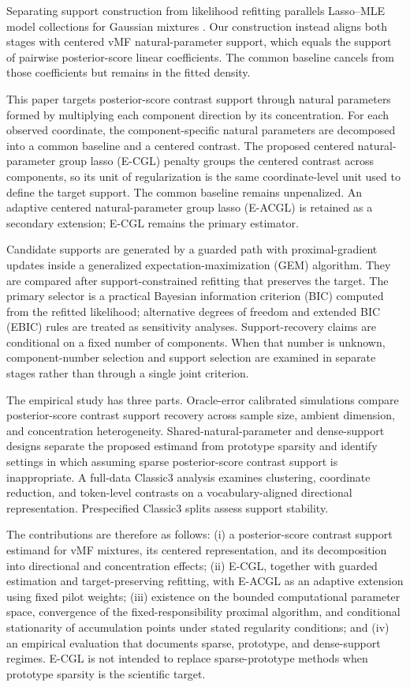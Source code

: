\documentclass[preprint,12pt,authoryear]{elsarticle}
\newcounter{algorithm}
\begin{document}
Separating support construction from likelihood refitting parallels
Lasso--MLE model collections for Gaussian mixtures
\citep{meynet2012thesis,meynet2012sparse}. Our construction instead aligns
both stages with centered vMF natural-parameter support, which equals the
support of pairwise posterior-score linear coefficients. The common baseline
cancels from those coefficients but remains in the fitted density.

This paper targets posterior-score contrast support through natural parameters
formed by multiplying each component direction by its concentration. For each
observed coordinate, the component-specific natural parameters are decomposed
into a common baseline and a centered contrast. The proposed centered
natural-parameter group lasso (E-CGL) penalty
groups the centered contrast across components, so its unit of regularization
is the same coordinate-level unit used to define the target support. The common
baseline remains unpenalized. An adaptive centered natural-parameter group
lasso (E-ACGL) is retained as a secondary extension; E-CGL remains the primary
estimator.

Candidate supports are generated by a guarded path with proximal-gradient
updates inside a generalized expectation-maximization (GEM) algorithm. They
are compared after support-constrained
refitting that preserves the target.
The primary selector is a practical Bayesian information criterion (BIC)
computed from the refitted likelihood; alternative degrees of freedom and
extended BIC (EBIC) rules are treated as sensitivity
analyses. Support-recovery claims are conditional on a fixed number of components.
When that number is unknown, component-number selection and support selection
are examined in separate stages rather than through a single joint criterion.

The empirical study has three parts. Oracle-error calibrated simulations
compare posterior-score contrast support recovery across sample size, ambient
dimension, and concentration heterogeneity. Shared-natural-parameter and
dense-support designs separate the proposed estimand from prototype sparsity
and identify settings in which assuming sparse posterior-score contrast
support is inappropriate. A full-data Classic3
analysis examines clustering, coordinate reduction, and token-level contrasts
on a vocabulary-aligned directional representation. Prespecified Classic3
splits assess support stability.

The contributions are therefore as follows: (i) a posterior-score contrast support
estimand for vMF mixtures, its centered representation, and its decomposition
into directional and concentration effects; (ii) E-CGL, together with guarded
estimation and target-preserving refitting, with E-ACGL as an adaptive
extension using fixed pilot weights;
(iii) existence on the bounded computational parameter space, convergence of
the fixed-responsibility proximal algorithm, and conditional stationarity of
accumulation points under stated regularity conditions; and
(iv) an empirical evaluation that documents sparse, prototype, and
dense-support regimes.
E-CGL is not intended to replace sparse-prototype methods when prototype
sparsity is the scientific target.
\end{document}
